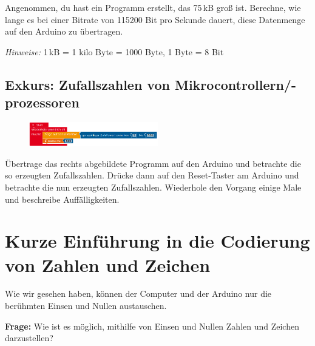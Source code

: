 \begin{aufgabe}
	Angenommen, du hast ein Programm erstellt, das 75\,kB groß ist. Berechne, wie lange es bei einer Bitrate von 115200 Bit pro Sekunde dauert, diese Datenmenge auf den Arduino zu übertragen.
	
	\emph{Hinweise:} 1\,kB = 1 kilo Byte = 1000 Byte, 1 Byte = 8 Bit
\end{aufgabe}

\subsection{Exkurs: Zufallszahlen von Mikrocontrollern/-prozessoren}

\begin{aufgabe}
	
	\begin{figure}
		\centering
		\vspace{-\baselineskip}
		\includegraphics[width=0.5\textwidth]{pics/zufallszahlengenerator.png}
	\end{figure}
	Übertrage das rechts abgebildete Programm auf den Arduino und betrachte die so erzeugten Zufallszahlen. Drücke dann auf den Reset-Taster am Arduino und betrachte die nun erzeugten Zufallszahlen. Wiederhole den Vorgang einige Male und beschreibe Auffälligkeiten.
\end{aufgabe}

\newpage
\section{Kurze Einführung in die Codierung von Zahlen und Zeichen}
Wie wir gesehen haben, können der Computer und der Arduino nur die berühmten Einsen und Nullen austauschen.

\begin{ziel}
	\textbf{Frage:} Wie ist es möglich, mithilfe von Einsen und Nullen Zahlen und Zeichen darzustellen?
\end{ziel}

